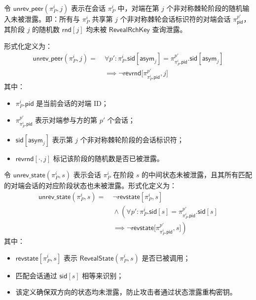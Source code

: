 \begin{definition}[对端棘轮新鲜度 ]
\label{def:peer_ratchet}
令 $\mathsf{unrev\_peer}(\pi_P^i, j)$ 表示在会话 $\pi_P^i$ 中，对端在第 $j$ 个非对称棘轮阶段的随机输入未被泄露。即：所有与 $\pi_P^i$ 共享第 $j$ 个非对称棘轮会话标识符的对端会话 $\pi_{\mathsf{pid}}^{p'}$，其阶段 $j$ 的随机数 $\mathsf{rnd}[j]$ 均未被 $\mathsf{RevealRchKey}$ 查询泄露。

形式化定义为：
\[
\begin{aligned}
\mathsf{unrev\_peer}(\pi_P^i, j) = 
  &\ \forall p' : \pi_P^i.\mathsf{sid}[\mathsf{asym}_j] = \pi_{\pi_P^i.\mathsf{pid}}^{p'}.\mathsf{sid}[\mathsf{asym}_j] \\
  &\ \implies \neg \mathsf{revrnd}\big[\pi_{\pi_P^i.\mathsf{pid}}^{p'}, j\big]
\end{aligned}
\]
其中：
\begin{itemize}
  \item $\pi_P^i.\mathsf{pid}$ 是当前会话的对端 ID；
  \item $\pi_{\pi_P^i.\mathsf{pid}}^{p'}$ 表示对端参与方的第 $p'$ 个会话；
  \item $\mathsf{sid}[\mathsf{asym}_j]$ 表示第 $j$ 个非对称棘轮阶段的会话标识符；
  \item $\mathsf{revrnd}[\cdot, j]$ 标记该阶段的随机数是否已被泄露。
\end{itemize}
\end{definition}

\begin{definition}[状态新鲜度]
\label{def:state_fresh}
令 $\mathsf{unrev\_state}(\pi_P^i, s)$ 表示会话 $\pi_P^i$ 在阶段 $s$ 的中间状态未被泄露，且其所有匹配的对端会话的对应阶段状态也未被泄露。形式化定义为：
\[
\begin{aligned}
\mathsf{unrev\_state}(\pi_P^i, s) = 
  &\ \neg \mathsf{revstate}[\pi_P^i, s] \\
  &\ \land \left( \forall p' : \pi_P^i.\mathsf{sid}[s] = \pi_{\pi_P^i.\mathsf{pid}}^{p'}.\mathsf{sid}[s] \right. \\
  &\ \left. \implies \neg \mathsf{revstate}\big[\pi_{\pi_P^i.\mathsf{pid}}^{p'}, s\big] \right)
\end{aligned}
\]
其中：
\begin{itemize}
  \item $\mathsf{revstate}[\pi_P^i, s]$ 表示 $\mathsf{RevealState}(\pi_P^i, s)$ 是否已被调用；
  \item 匹配会话通过 $\mathsf{sid}[s]$ 相等来识别；
  \item 该定义确保双方向的状态均未泄露，防止攻击者通过状态泄露重构密钥。
\end{itemize}
\end{definition}

